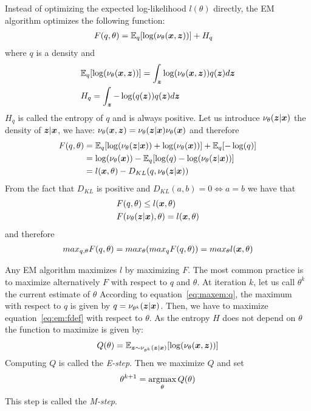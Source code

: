 Instead of optimizing the expected log-likelihood $l(\theta)$ directly, the EM algorithm optimizes the following function:
\begin{align}
  F(q, \theta) &= \mathbb{E}_q[\log( \nu_{\theta}(\boldsymbol{x}, \boldsymbol{z}))] + H_q \label{eq:em:fdef}
\end{align}
where $q$ is a density and 
\begin{align}
  &\mathbb{E}_q[\log( \nu_{\theta}(\boldsymbol{x}, \boldsymbol{z}))] = \int_{\boldsymbol{z}} \log( \nu_{\theta}(\boldsymbol{x}, \boldsymbol{z})) q(\boldsymbol{z}) d\boldsymbol{z}  \\
  &H_q = \int_{\boldsymbol{z}} -\log(q(\boldsymbol{z})) q(\boldsymbol{z}) d\boldsymbol{z} 
\end{align}
$H_q$ is called the entropy of $q$ and is always positive.
Let us introduce $\nu_{\theta}(\boldsymbol{z} | \boldsymbol{x})$ the density of $\boldsymbol{z} | \boldsymbol{x}$, we have:
$\nu_{\theta}(\boldsymbol{x}, \boldsymbol{z}) = \nu_{\theta}(\boldsymbol{z} | \boldsymbol{x}) \nu_{\theta}(\boldsymbol{x})$ and
therefore
\begin{align}
  F(q, \theta) &= \mathbb{E}_q[\log( \nu_{\theta}(\boldsymbol{z}| \boldsymbol{x})) + \log( \nu_{\theta}(\boldsymbol{x}))] + \mathbb{E}_q[-\log(q)] \\
  &= \log(\nu_{\theta}(\boldsymbol{x})) - \mathbb{E}_q[ \log(q) - \log( \nu_{\theta}(\boldsymbol{z}| \boldsymbol{x}))] \\
               &= l(\boldsymbol{x}, \theta) - D_{KL}(q, \nu_{\theta}(\boldsymbol{z}| \boldsymbol{x}))
\end{align}
From the fact that $D_{KL}$ is positive and $D_{KL}(a, b) = 0 \iff a = b$ we
have that
\begin{align}
  &F(q, \theta) \leq l(\boldsymbol{x}, \theta) \\
  &F(\nu_{\theta}(\boldsymbol{z}| \boldsymbol{x}), \theta) = l(\boldsymbol{x}, \theta) \label{eq:maxem:q}
\end{align}
and therefore
\begin{align}
  max_{q, \theta} F(q, \theta) = max_{\theta} (max_q F(q, \theta)) = max_{\theta} l(\boldsymbol{x}, \theta)
\end{align}

Any EM algorithm maximizes $l$ by maximizing $F$.
The most common practice is to maximize alternatively $F$ with respect to
$q$ and $\theta$.
At iteration $k$, let us call $\theta^k$ the current estimate of $\theta$
According to equation~\eqref{eq:maxem:q}, the maximum with
respect to $q$ is given by $q=\nu_{\theta^k}(\boldsymbol{z}| \boldsymbol{x})$. Then, we have to
maximize equation~\eqref{eq:em:fdef} with respect to $\theta$.
As the entropy $H$ does not depend on $\theta$ the function to maximize is given
by:
\begin{align}
  Q(\theta ) =  \mathbb{E}_{\boldsymbol{z} \sim \nu_{\theta^k }(\boldsymbol{z} | \boldsymbol{x})}[\log( \nu_{\theta }(\boldsymbol{x}, \boldsymbol{z}))]
\end{align}
Computing $Q$ is called the \emph{E-step}. Then we maximize $Q$ and set
\begin{align}
  \theta^{k+1} = \operatorname*{argmax}_{\theta} Q(\theta) \label{eq:exact:mstep}
\end{align}
This step is called the \emph{M-step}.

